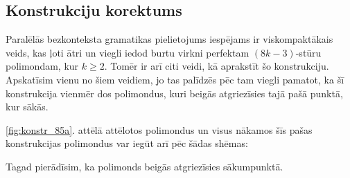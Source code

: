 \documentclass[utf8]{ludis2022}
\begin{document}
\subsection{Konstrukciju korektums}

\firstparskip Paralēlās bezkonteksta gramatikas pielietojums iespējams ir viskompaktākais veids, kas ļoti ātri un viegli iedod burtu virkni perfektam $(8k-3)$-stūru polimondam, kur $k\geq 2$. Tomēr ir arī citi veidi, kā aprakstīt šo konstrukciju. Apskatīsim vienu no šiem veidiem, jo tas palīdzēs pēc tam viegli pamatot, ka šī konstrukcija vienmēr dos polimondus, kuri beigās atgriezīsies tajā pašā punktā, kur sākās.

\ref{fig:konstr_85a}. attēlā attēlotos polimondus un visus nākamos šīs pašas konstrukcijas polimondus var iegūt arī pēc šādas shēmas:

\vspace{10pt}

\noindent{}

\vspace{10pt}

Tagad pierādīsim, ka polimonds beigās atgriezīsies sākumpunktā.
\end{document}
